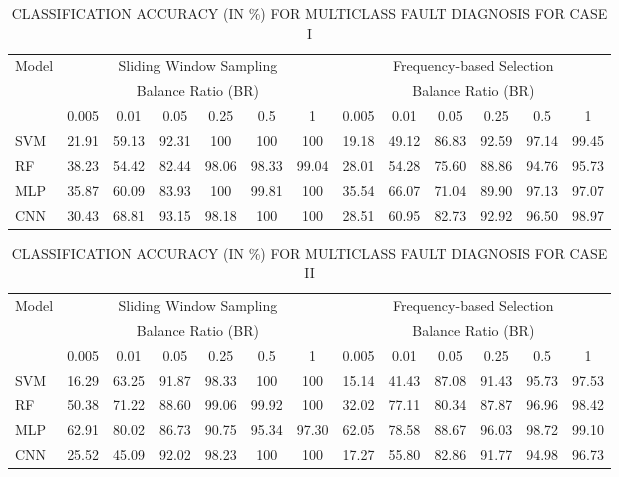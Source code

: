 \documentclass[conference,twocolumn]{IEEEtran}
\begin{document}
\begin{table}[htbp]
\centering
\caption{CLASSIFICATION ACCURACY (IN \%) FOR MULTICLASS FAULT DIAGNOSIS FOR CASE I}
\label{tab:accuracy_caseI}
\begin{tabular}{lcccccccccccc}
\toprule
\multirow{2}{*}{Model} & \multicolumn{6}{c}{Sliding Window Sampling} & \multicolumn{6}{c}{Frequency-based Selection} \\
 & \multicolumn{6}{c}{Balance Ratio (BR)} & \multicolumn{6}{c}{Balance Ratio (BR)} \\
 & 0.005 & 0.01 & 0.05 & 0.25 & 0.5 & 1 & 0.005 & 0.01 & 0.05 & 0.25 & 0.5 & 1 \\
\midrule
SVM & 21.91 & 59.13 & 92.31 & 100 & 100 & 100 & 19.18 & 49.12 & 86.83 & 92.59 & 97.14 & 99.45 \\
RF & 38.23 & 54.42 & 82.44 & 98.06 & 98.33 & 99.04 & 28.01 & 54.28 & 75.60 & 88.86 & 94.76 & 95.73 \\
MLP & 35.87 & 60.09 & 83.93 & 100 & 99.81 & 100 & 35.54 & 66.07 & 71.04 & 89.90 & 97.13 & 97.07 \\
CNN & 30.43 & 68.81 & 93.15 & 98.18 & 100 & 100 & 28.51 & 60.95 & 82.73 & 92.92 & 96.50 & 98.97 \\
\bottomrule
\end{tabular}
\end{table}

\begin{table}[htbp]
\centering
\caption{CLASSIFICATION ACCURACY (IN \%) FOR MULTICLASS FAULT DIAGNOSIS FOR CASE II}
\label{tab:accuracy_caseII}
\begin{tabular}{lcccccccccccc}
\toprule
\multirow{2}{*}{Model} & \multicolumn{6}{c}{Sliding Window Sampling} & \multicolumn{6}{c}{Frequency-based Selection} \\
 & \multicolumn{6}{c}{Balance Ratio (BR)} & \multicolumn{6}{c}{Balance Ratio (BR)} \\
 & 0.005 & 0.01 & 0.05 & 0.25 & 0.5 & 1 & 0.005 & 0.01 & 0.05 & 0.25 & 0.5 & 1 \\
\midrule
SVM & 16.29 & 63.25 & 91.87 & 98.33 & 100 & 100 & 15.14 & 41.43 & 87.08 & 91.43 & 95.73 & 97.53 \\
RF & 50.38 & 71.22 & 88.60 & 99.06 & 99.92 & 100 & 32.02 & 77.11 & 80.34 & 87.87 & 96.96 & 98.42 \\
MLP & 62.91 & 80.02 & 86.73 & 90.75 & 95.34 & 97.30 & 62.05 & 78.58 & 88.67 & 96.03 & 98.72 & 99.10 \\
CNN & 25.52 & 45.09 & 92.02 & 98.23 & 100 & 100 & 17.27 & 55.80 & 82.86 & 91.77 & 94.98 & 96.73 \\
\bottomrule
\end{tabular}
\end{table}
\end{document}
